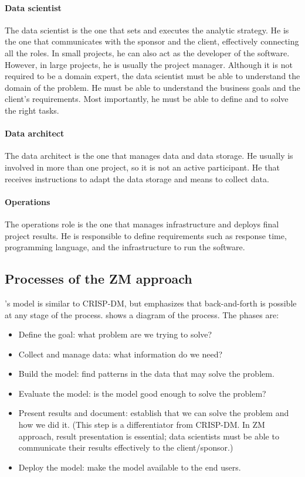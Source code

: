 \paragraph{Data scientist}  The data scientist is the one that sets and executes the
analytic strategy.  He is the one that communicates with the sponsor and the client,
effectively connecting all the roles.  In small projects, he can also act as the developer
of the software.  However, in large projects, he is usually the project manager.
Although it is not required to be a domain expert, the data scientist must be able to
understand the domain of the problem.  He must be able to understand the business goals and
the client's requirements.  Most importantly, he must be able to define and to solve the
right tasks.

\paragraph{Data architect}  The data architect is the one that manages data and data storage.
He usually is involved in more than one project, so it is not an active participant.  He
that receives instructions to adapt the data storage and means to collect data.

\paragraph{Operations}  The operations role is the one that manages infrastructure and
deploys final project results.  He is responsible to define requirements such as response
time, programming language, and the infrastructure to run the software.

\subsection{Processes of the ZM approach}

\citeauthor{Zumel2019}'s model is similar to CRISP-DM, but emphasizes that back-and-forth
is possible at any stage of the process.   shows a diagram of the process.
The phases are:
\begin{itemize}
  \itemsep0em
  \item Define the goal: what problem are we trying to solve?
  \item Collect and manage data: what information do we need?
  \item Build the model: find patterns in the data that may solve the problem.
  \item Evaluate the model: is the model good enough to solve the problem?
  \item Present results and document: establish that we can solve the problem and how we
    did it. (This step is a differentiator from CRISP-DM.  In ZM approach, result
    presentation is essential; data scientists must be able to communicate their results
    effectively to the client/sponsor.)
  \item Deploy the model: make the model available to the end users.
\end{itemize}

